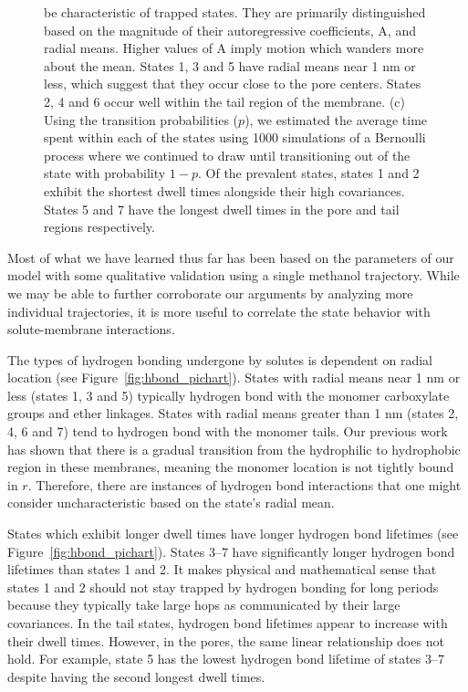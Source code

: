 \documentclass[journal=jpcbfk,manuscript=article]{achemso}
\begin{document}
\begin{figure}
{  be characteristic of trapped states. They are primarily distinguished based on the magnitude of their 
  autoregressive coefficients, A, and radial means. Higher values of A imply motion which wanders 
  more about the mean. States 1, 3 and 5 have radial means near 1 nm or less, which suggest that they
  occur close to the pore centers. States 2, 4 and 6 occur well within the tail region of the membrane.
  (c) Using the transition probabilities ($p$), we estimated the average time spent within each 
  of the states using 1000 simulations of a Bernoulli process where we continued to draw until transitioning
  out of the state with probability $1 - p$. Of the prevalent states, states 1 and 
  2 exhibit the shortest dwell times alongside their high covariances. States 5 and 7 have the longest dwell times in the pore and tail regions respectively.
  }\label{fig:common_states_MET}
  \end{figure}
  
  Most of what we have learned thus far has been based on the parameters of our
  model with some qualitative validation using a single methanol trajectory. While 
  we may be able to further corroborate our arguments by analyzing more
  individual trajectories, it is more useful to correlate the state behavior with
  solute-membrane interactions.

  The types of hydrogen bonding undergone by solutes is dependent on radial
  location (see Figure~\ref{fig:hbond_pichart}). States with radial means near 1 nm
  or less (states 1, 3 and 5) typically hydrogen bond with the monomer carboxylate
  groups and ether linkages. States with radial means greater than 1 nm (states 2,
  4, 6 and 7) tend to hydrogen bond with the monomer tails. 
  Our previous work has
  shown that there is a gradual transition from the hydrophilic to hydrophobic region in
  these membranes, meaning the monomer location is not tightly bound in $r$. 
  Therefore, there are instances of hydrogen bond interactions that one might consider 
  uncharacteristic based on the state's radial mean.

  States which exhibit longer dwell times have longer hydrogen bond lifetimes (see
  Figure~\ref{fig:hbond_pichart}). States 3--7 have significantly longer hydrogen 
  bond lifetimes than states 1 and 2. It makes physical and mathematical sense that
  states 1 and 2 should not stay trapped by hydrogen bonding for long periods because
  they typically take large hops as communicated by their large covariances.
  In the tail states, hydrogen bond lifetimes appear to increase with their dwell 
  times. However, in the pores, the same linear relationship does not hold.
  For example, state 5 has the lowest hydrogen bond lifetime of states 3--7
  despite having the second longest dwell times. 
  
\end{document}
